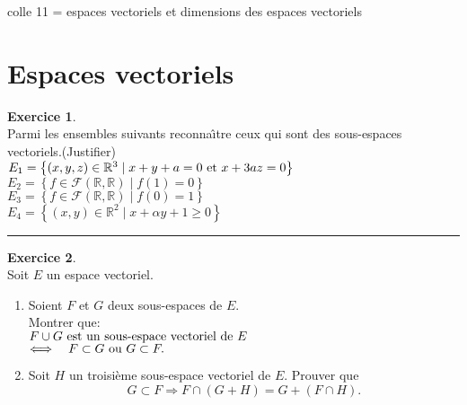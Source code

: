 \documentclass[a4paper,10pt]{article}
\theoremstyle{definition}
\theoremstyle{definition}
\newtheorem{exo}{Exercice}
\newcommand{\R}{\mathbb{R}}
\begin{document}
	
	
	\begin{center}
		\Large \sc colle 11 = espaces vectoriels et dimensions des espaces vectoriels
	\end{center}




\section*{Espaces vectoriels}
\begin{minipage}{1\linewidth}
	\begin{minipage}[t]{0.48\linewidth}
		\raggedright
		
		
		
		\begin{exo}\quad\\
		Parmi les ensembles suivants reconna\^\i tre ceux qui sont des
		sous-espaces vectoriels.(Justifier)\\[0.25cm]
		
		$ E_1 =\left\{ (x,y,z)\in \R^3 \mid x+y+a=0 \hbox{ et }  x +3az =0\right\}$\\[0.2cm]
		
		$ E_2 =\left\{f \in {\mathcal F}(\R,\R) \mid f(1)=0\right\}$\\[0.2cm]
		
		$ E_3 =\left\{f \in {\mathcal F}(\R,\R) \mid  f(0)=1\right\}$\\[0.2cm]
		
		$E_4 =\left\{(x,y)\in \R^2 \mid x + \alpha y +1 \geqslant 0\right\}$	
			
			\centering
			\rule{1\linewidth}{0.6pt}
		\end{exo}
	

	
	\begin{exo}\quad\\
		Soit $E$ un espace vectoriel.
	\begin{enumerate}
		\item Soient $F$ et $G$ deux sous-espaces de $E$.\\ Montrer que:\\[0.25cm]
		$F \cup G \hbox{ est un sous-espace vectoriel de } E$\\ $ \Longleftrightarrow \quad F\subset G \hbox{ ou } G \subset F.$\\[0.25cm]
		\item Soit $H$ un troisi\`eme sous-espace vectoriel de $E$. Prouver
		que
		$$G \subset F \Longrightarrow F\cap(G+H) = G + (F\cap H) .$$
	\end{enumerate}
		

\end{exo}
\end{minipage}
\end{minipage}
\end{document}
